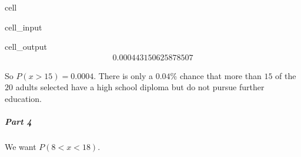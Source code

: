 \documentclass[letterpaper,10pt,english]{jupyterBook}
\begin{document}
\begin{sphinxuseclass}{cell}\begin{sphinxVerbatimInput}

\begin{sphinxuseclass}{cell_input}
\begin{sphinxVerbatim}[commandchars=\\\{\}]
\end{sphinxVerbatim}

\end{sphinxuseclass}\end{sphinxVerbatimInput}
\begin{sphinxVerbatimOutput}

\begin{sphinxuseclass}{cell_output}\begin{equation*}
\begin{split}0.000443150625878507\end{split}
\end{equation*}
\end{sphinxuseclass}\end{sphinxVerbatimOutput}

\end{sphinxuseclass}
\sphinxAtStartPar
So \(P(x > 15) = 0.0004\). There is only a \(0.04\%\) chance that more than \(15\) of the \(20\) adults selected have a high school diploma but do not pursue further education.


\subparagraph{Part 4}
\label{\detokenize{Ch3 Probability/3.6 The Binomial Distribution:part-4}}
\sphinxAtStartPar
We want \(P(8 < x < 18)\).
\end{document}
